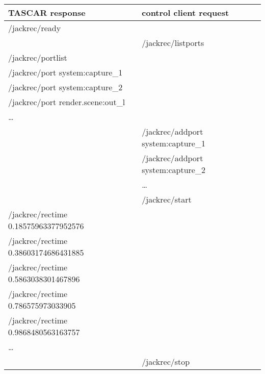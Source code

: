 \begin{tabular}{|l|l|}
  \hline
  TASCAR response                                 & control client request             \\
  \hline
  \hline
  /jackrec/ready                                  &                                    \\
  \hline
                                                  & /jackrec/listports                 \\
  \hline
  /jackrec/portlist                               &                                    \\
  /jackrec/port system:capture\_1                 &                                    \\
  /jackrec/port system:capture\_2                 &                                    \\
  /jackrec/port render.scene:out\_l               &                                    \\
  \dots                                           &                                    \\
  \hline
                                                  & /jackrec/addport system:capture\_1 \\
                                                  & /jackrec/addport system:capture\_2 \\
                                                  & \dots                              \\
  \hline
                                                  & /jackrec/start                     \\
  \hline
  /jackrec/rectime 0.18575963377952576            &                                    \\
  /jackrec/rectime 0.38603174686431885            &                                    \\
  /jackrec/rectime 0.5863038301467896             &                                    \\
  /jackrec/rectime 0.786575973033905              &                                    \\
  /jackrec/rectime 0.9868480563163757             &                                    \\
  \dots                                           &                                    \\
  \hline
                                                  & /jackrec/stop                      \\

\end{tabular}
